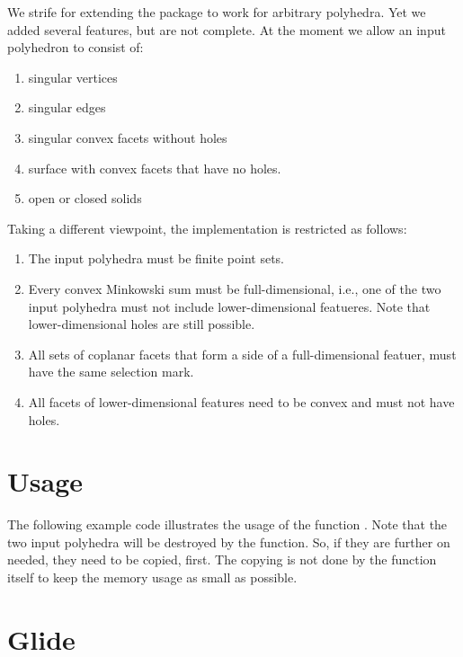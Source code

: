 We strife for extending the package to work for arbitrary
polyhedra. Yet we added several features, but are not complete. At
the moment we allow an input polyhedron to consist of:
\begin{enumerate}
\item singular vertices
\item singular edges
\item singular convex facets without holes
\item surface with convex facets that have no holes.
\item open or closed solids
\end{enumerate}

Taking a different viewpoint, the implementation is restricted as
follows:
\begin{enumerate}
\item The input polyhedra must be finite point sets.
\item Every convex Minkowski sum must be full-dimensional, i.e., one 
of the two input polyhedra must not include lower-dimensional
featueres. Note that lower-dimensional holes are still possible.
\item All sets of coplanar facets that form a side of a full-dimensional
featuer, must have the same selection mark.
\item All facets of lower-dimensional features need to be convex and 
must not have holes.
\end{enumerate}

\section{Usage}

The following example code illustrates the usage of the function
. Note that the two input polyhedra will be
destroyed by the function. So, if they are further on needed, they
need to be copied, first. The copying is not done by the function
itself to keep the memory usage as small as possible.


\section{Glide}

